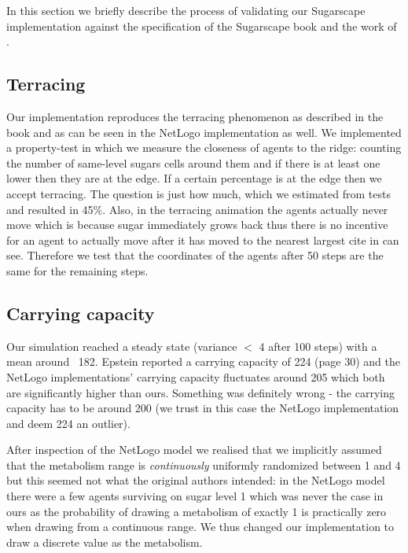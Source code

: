 In this section we briefly describe the process of validating our Sugarscape implementation against the specification of the Sugarscape book \cite{epstein_growing_1996} and the work of \cite{weaver_replicating_2009}.

\subsection{Terracing}
Our implementation reproduces the terracing phenomenon as described in the book and as can be seen in the NetLogo implementation as well. We implemented a property-test in which we measure the closeness of agents to the ridge: counting the number of same-level sugars cells around them and if there is at least one lower then they are at the edge. If a certain percentage is at the edge then we accept terracing. The question is just how much, which we estimated from tests and resulted in 45\%. Also, in the terracing animation the agents actually never move which is because sugar immediately grows back thus there is no incentive for an agent to actually move after it has moved to the nearest largest cite in can see. Therefore we test that the coordinates of the agents after 50 steps are the same for the remaining steps.

\subsection{Carrying capacity}
Our simulation reached a steady state (variance $<$ 4 after 100 steps) with a mean around ~182. Epstein reported a carrying capacity of 224 (page 30) and the NetLogo implementations' \cite{weaver_replicating_2009} carrying capacity fluctuates around 205 which both are significantly higher than ours. Something was definitely wrong - the carrying capacity has to be around 200 (we trust in this case the NetLogo implementation and deem 224 an outlier).

After inspection of the NetLogo model we realised that we implicitly assumed that the metabolism range is \textit{continuously} uniformly randomized between 1 and 4 but this seemed not what the original authors intended: in the NetLogo model there were a few agents surviving on sugar level 1 which was never the case in ours as the probability of drawing a metabolism of exactly 1 is practically zero when drawing from a continuous range. We thus changed our implementation to draw a discrete value as the metabolism. %

